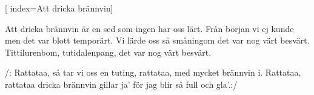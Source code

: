 [
	index={Att dricka brännvin}]		
	
\beginverse*						
Att dricka brännvin är en sed
som ingen har oss lärt.
Från början vi ej kunde 
men det var blott temporärt.
Vi lärde oss så småningom
det var nog värt besvärt.
Tittilurenbom, tutidalenpang,
det var nog värt besvärt.
\endverse						

\beginchorus				
/: Rattataa, så tar vi oss en tuting,
rattataa, med mycket brännvin i.
Rattataa, rattataa
dricka brännvin gillar ja'
för jag blir så full och gla’.:/
\endchorus				
\endsong		
